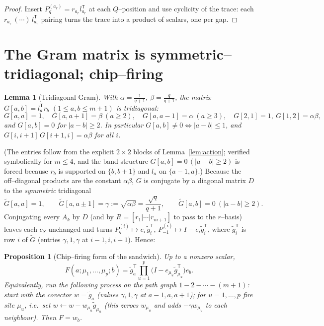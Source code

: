\documentclass[11pt]{article}
\newtheorem{lemma}[theorem]{Lemma}
\newtheorem{proposition}[theorem]{Proposition}
\theoremstyle{definition}
\newcommand{\Pq}{P_{q}}
\newcommand{\Pm}{P_{-1}}
\newcommand{\Gt}{\widetilde G}
\begin{document}
\begin{proof}
Insert $\Pq^{(a_r)}=r_{a_r}l_{a_r}^{\mathsf T}$ at each $Q$--position and use cyclicity
of the trace: each $r_{a_r}\,(\cdots)\,l_{a_{r}}^{\mathsf T}$ pairing turns the trace into
a product of scalars, one per gap.
\end{proof}

\section{The Gram matrix is symmetric--tridiagonal; chip--firing}

\begin{lemma}[Tridiagonal Gram]\label{lem:gram}
With $\alpha=\tfrac1{q+1}$, $\beta=\tfrac{q}{q+1}$, the matrix $G[a,b]=l_a^{\mathsf T}r_b$
$(1\le a,b\le m+1)$ is tridiagonal:
\[
G[a,a]=1,\quad G[a,a+1]=\beta\ (a\ge2),\quad G[a,a-1]=\alpha\ (a\ge3),\quad
G[2,1]=1,\ G[1,2]=\alpha\beta,
\]
and $G[a,b]=0$ for $|a-b|\ge2$. In particular $G[a,b]\ne0\iff|a-b|\le1$, and
$G[i,i+1]\,G[i+1,i]=\alpha\beta$ for all $i$.
\end{lemma}

\noindent(The entries follow from the explicit $2\times2$ blocks of
Lemma~\ref{lem:action}; verified symbolically for $m\le4$, and the band structure
$G[a,b]=0\,(|a-b|\ge2)$ is forced because $r_b$ is supported on $\{b,b+1\}$ and $l_a$
on $\{a-1,a\}$.) Because the off--diagonal products are the constant $\alpha\beta$,
$G$ is conjugate by a diagonal matrix $D$ to the \emph{symmetric} tridiagonal
\[
\Gt[a,a]=1,\qquad \Gt[a,a\pm1]=\gamma:=\sqrt{\alpha\beta}=\frac{\sqrt q}{q+1},\qquad
\Gt[a,b]=0\ (|a-b|\ge2).
\]
Conjugating every $A_k$ by $D$ (and by $R=[r_1|\cdots|r_{m+1}]$ to pass to the
$r$--basis) leaves each $c_S$ unchanged and turns $\Pq^{(i)}\mapsto e_i\,\tilde g_i^{\mathsf T}$,
$\Pm^{(i)}\mapsto I-e_i\tilde g_i^{\mathsf T}$, where $\tilde g_i^{\mathsf T}$ is row $i$ of
$\Gt$ (entries $\gamma,1,\gamma$ at $i-1,i,i+1$). Hence:

\begin{proposition}[Chip--firing form of the sandwich]\label{prop:chip}
Up to a nonzero scalar,
\[
F(a;\mu_1,\dots,\mu_p;b)=\tilde g_a^{\mathsf T}\prod_{u=1}^{p}\bigl(I-e_{\mu_u}\tilde g_{\mu_u}^{\mathsf T}\bigr)e_b .
\]
Equivalently, run the following process on the path graph $1\!-\!2\!-\!\cdots\!-\!(m{+}1)$:
start with the covector $w=\tilde g_a$ (values $\gamma,1,\gamma$ at $a{-}1,a,a{+}1$); for
$u=1,\dots,p$ \emph{fire} site $\mu_u$, i.e.\ set
$w\leftarrow w-w_{\mu_u}\tilde g_{\mu_u}$ (this zeroes $w_{\mu_u}$ and adds
$-\gamma w_{\mu_u}$ to each neighbour). Then $F=w_b$.
\end{proposition}
\end{document}
